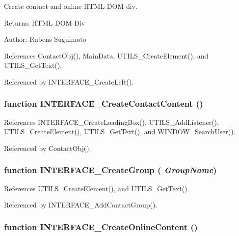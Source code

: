 Create contact and online HTML DOM div. 

\begin{Desc}
\item[Returns:]HTML DOM Div \end{Desc}
\begin{Desc}
\item[Author:]Rubens Suguimoto \end{Desc}


References ContactObj(), MainData, UTILS\_\-CreateElement(), and UTILS\_\-GetText().

Referenced by INTERFACE\_\-CreateLeft().
\subsubsection[INTERFACE\_\-CreateContactContent]{\setlength{\rightskip}{0pt plus 5cm}function INTERFACE\_\-CreateContactContent ()}\label{interface_2contact_8js_0fb5ab190b974eaf63e2a6a4dbb84b52}




References INTERFACE\_\-CreateLoadingBox(), UTILS\_\-AddListener(), UTILS\_\-CreateElement(), UTILS\_\-GetText(), and WINDOW\_\-SearchUser().

Referenced by ContactObj().
\subsubsection[INTERFACE\_\-CreateGroup]{\setlength{\rightskip}{0pt plus 5cm}function INTERFACE\_\-CreateGroup ( {\em GroupName})}\label{interface_2contact_8js_fdd2bd640d3145fa915630d0f52d1a3a}




References UTILS\_\-CreateElement(), and UTILS\_\-GetText().

Referenced by INTERFACE\_\-AddContactGroup().
\subsubsection[INTERFACE\_\-CreateOnlineContent]{\setlength{\rightskip}{0pt plus 5cm}function INTERFACE\_\-CreateOnlineContent ()}\label{interface_2contact_8js_2e4cc3991845152ed817c111ad649e8f}



